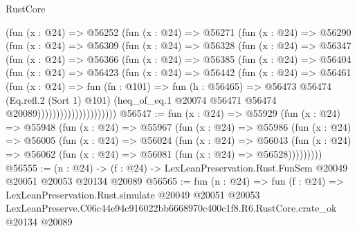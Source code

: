 \begin{lexlean}{RustCore}
\begin{coremodule}
                  (fun (x : @24) =>
                  @56252
                    (fun (x : @24) =>
                    @56271
                      (fun (x : @24) =>
                      @56290
                        (fun (x : @24) =>
                        @56309
                          (fun (x : @24) =>
                          @56328
                            (fun (x : @24) =>
                            @56347
                              (fun (x : @24) =>
                              @56366
                                (fun (x : @24) =>
                                @56385
                                  (fun (x : @24) =>
                                  @56404
                                    (fun (x : @24) =>
                                    @56423
                                      (fun (x : @24) =>
                                      @56442
                                        (fun (x : @24) =>
                                        @56461
                                          (fun (x : @24) =>
                                          fun (fn : @101) =>
                                          fun (h : @56465) =>
                                          @56473
                                            @56474
                                            (Eq.refl.{2} (Sort 1) @101)
                                            (heq_of_eq.{1}
                                              @20074
                                              @56471
                                              @56474
                                              @20089)))))))))))))))))))))
@56547 := fun (x : @24) =>
  @55929
    (fun (x : @24) =>
    @55948
      (fun (x : @24) =>
      @55967
        (fun (x : @24) =>
        @55986
          (fun (x : @24) =>
          @56005
            (fun (x : @24) =>
            @56024
              (fun (x : @24) =>
              @56043
                (fun (x : @24) => @56062 (fun (x : @24) => @56081 (fun (x : @24) => @56528)))))))))
@56555 := (n : @24) ->
  (f : @24) -> LexLeanPreservation.Rust.FunSem @20049 @20051 @20053 @20134 @20089
@56565 := fun (n : @24) =>
  fun (f : @24) =>
  LexLeanPreservation.Rust.simulate
    @20049
    @20051
    @20053
    LexLeanPreserve.C06c44e94c916022bb6668970c400c1f8.R6.RustCore.crate_ok
    @20134
    @20089
\end{coremodule}
\end{lexlean}
